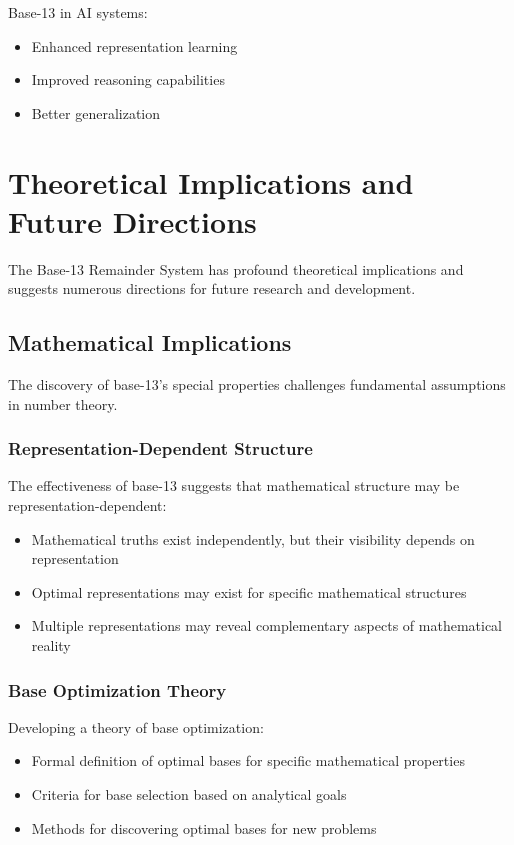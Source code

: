 \documentclass[12pt,a4paper]{report}
\begin{document}
Base-13 in AI systems:
\begin{itemize}
\item Enhanced representation learning
\item Improved reasoning capabilities
\item Better generalization
\end{itemize}

\chapter{Theoretical Implications and Future Directions}

The Base-13 Remainder System has profound theoretical implications and suggests numerous directions for future research and development.

\section{Mathematical Implications}

The discovery of base-13's special properties challenges fundamental assumptions in number theory.

\subsection{Representation-Dependent Structure}

The effectiveness of base-13 suggests that mathematical structure may be representation-dependent:

\begin{itemize}
\item Mathematical truths exist independently, but their visibility depends on representation
\item Optimal representations may exist for specific mathematical structures
\item Multiple representations may reveal complementary aspects of mathematical reality
\end{itemize}

\subsection{Base Optimization Theory}

Developing a theory of base optimization:

\begin{itemize}
\item Formal definition of optimal bases for specific mathematical properties
\item Criteria for base selection based on analytical goals
\item Methods for discovering optimal bases for new problems
\end{itemize}
\end{document}
